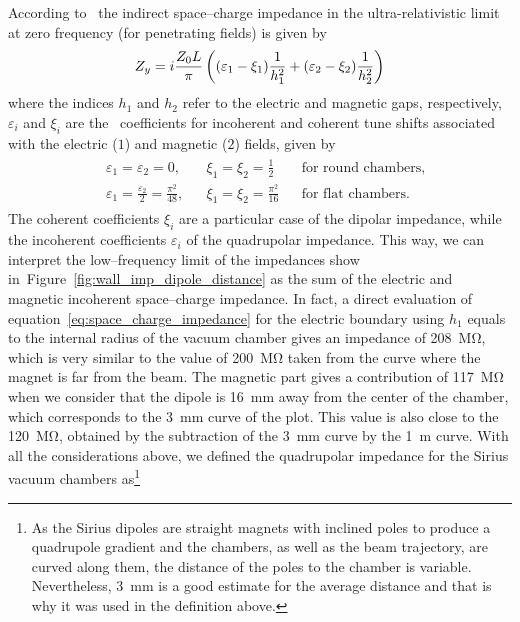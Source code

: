     According to~ the indirect space--charge impedance in the ultra-relativistic limit at zero frequency (for penetrating fields) is given by
    \begin{align}\label{eq:space_charge_impedance}
        Z_y = i\frac{Z_0L}{\pi}\left((\varepsilon_1-\xi_1)\frac{1}{h_1^2} +
                                         (\varepsilon_2-\xi_2)\frac{1}{h_2^2}\right)
    \end{align}
    where the indices $h_1$ and $h_2$ refer to the electric and magnetic gaps, respectively, $\varepsilon_i$ and $\xi_i$ are the~ coefficients for incoherent and coherent tune shifts associated with the electric ($1$) and magnetic ($2$) fields, given by
    \begin{align}\label{eq:laslett_coefficients}
        \begin{aligned}
            &\varepsilon_1 = \varepsilon_2 = 0, & &
            \xi_1 = \xi_2 = \frac12 & &
            \text{for round chambers},\\
            &\varepsilon_1=\frac{\varepsilon_2}{2} = \frac{\pi^2}{48}, & &
            \xi_1 = \xi_2 = \frac{\pi^2}{16} & &
            \text{for flat chambers.}
        \end{aligned}
    \end{align}
    The coherent coefficients $\xi_i$ are a particular case of the dipolar impedance, while the incoherent coefficients $\varepsilon_i$ of the quadrupolar impedance. This way, we can interpret the low--frequency limit of the impedances show in~Figure~\ref{fig:wall_imp_dipole_distance} as the sum of the electric and magnetic incoherent space--charge impedance. In fact, a direct evaluation of equation~\eqref{eq:space_charge_impedance} for the electric boundary using $h_1$ equals to the internal radius of the vacuum chamber gives an impedance of \SI{208}{\mega\ohm},
    which is very similar to the value of \SI{200}{\mega\ohm} taken from the curve where the magnet is far from the beam. The magnetic part gives a contribution of \SI{117}{\mega\ohm} when we consider that the dipole is \SI{16}{\milli\meter} away from the center of the chamber, which corresponds to the \SI{3}{\milli\meter} curve of the plot. This value is also close to the \SI{120}{\mega\ohm}, obtained by the subtraction of the \SI{3}{\milli\meter} curve by the \SI{1}{\meter} curve. With all the considerations above, we defined the quadrupolar impedance for the Sirius vacuum chambers as\footnote{As the Sirius dipoles are straight magnets with inclined poles to produce a quadrupole gradient and the chambers, as well as the beam trajectory, are curved along them, the distance of the poles to the chamber is variable. Nevertheless, \SI{3}{\milli\meter} is a good estimate for the average distance and that is why it was used in the definition above.}
